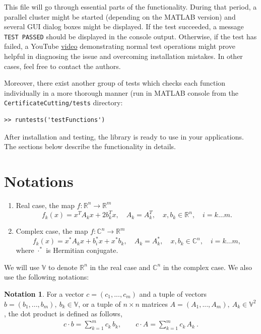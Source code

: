 \documentclass[a4paper]{article}
\theoremstyle{definition}
\newtheorem{definition}{Notation}[]
\begin{document}
\begin{enumerate}
This file will go through essential parts of the functionality. During that period, a parallel cluster might be started (depending on the MATLAB version) and several GUI dialog boxes might be displayed. If the test succeeded, a message {\tt TEST PASSED} should be displayed in the console output. Otherwise, if the test has failed, a YouTube \href{https://youtu.be/Ikh_GDHnu-4}{video} demonstrating normal test operations might prove helpful in diagnosing the issue and overcoming installation mistakes. In other cases, feel free to contact the authors.

Moreover, there exist another group of tests which checks each function individually in a more thorough manner (run in MATLAB console from the {\tt CertificateCutting/tests} directory:
\begin{verbatim}
>> runtests('testFunctions')
\end{verbatim}
\end{enumerate}

After installation and testing, the library is ready to use in your applications. The sections below describe the functionality in details.

\newpage

\section*{Notations}
\begin{enumerate}
\item Real case, the map $f\colon \mathbb{R}^n\to\mathbb{R}^m$
\begin{equation}
f_k(x)=x^TA_k x+2b_k^Tx ,\quad A_k=A_k^T ,\quad x, b_k\in \mathbb{R}^n ,\quad i=k\dots m . \label{real}
\end{equation}
\item Complex case, the map $f\colon \mathbb{C}^n\to\mathbb{R}^m$
\begin{equation}
f_k(x)=x^*A_k x+b_i^*x+x^*b_k ,\quad A_k=A_k^* ,\quad x, b_k\in \mathbb{C}^n ,\quad i=k\dots m ,\label{complex}
\end{equation}
where $\cdot^*$ is Hermitian conjugate.
\end{enumerate}

We will use $\mathbb{V}$ to denote $\mathbb{R}^n$ in the real case and $\mathbb{C}^n$ in the  complex case.
We also use the following notations:\\

\theoremstyle{definition}
\begin{definition}
For a vector $c=(c_1,...,c_m)$ and a tuple of vectors $b=(b_1,...,b_m), \ b_k \in \mathbb{V}$, or a tuple of $n\times n$ matrices $A=(A_1,...,A_m), \  A_k\in \mathbb{V}^2$, the dot product is defined as follows,
\begin{eqnarray}
c\cdot b=\sum\limits_{k=1}^m c_k\, b_k ,\qquad
c\cdot A=\sum\limits_{k=1}^m c_k\, A_k\ . \nonumber
\end{eqnarray}
\end{definition}
\end{document}
